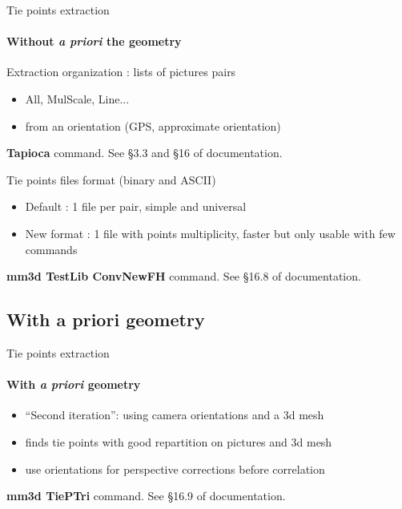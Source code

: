 \documentclass{beamer}
\begin{document}
        \begin{frame}{Tie points extraction }
                \framesubtitle{Without \textit{a priori} the geometry}   
                \begin{block}{Extraction organization : lists of pictures pairs}
                \begin{itemize}
                        \item All, MulScale, Line...
                        \item from an orientation (GPS, approximate orientation)
                \end{itemize}
                \end{block}
                \textbf{Tapioca} command. See §3.3 and §16 of documentation.
\pause
                \begin{block}{Tie points files format (binary and ASCII)}
                \begin{itemize}
                        \item Default : 1 file per pair, simple and universal
                        \item New format : 1 file with points multiplicity, faster but only usable with few commands
                \end{itemize}
                \end{block}
                \textbf{mm3d TestLib ConvNewFH} command. See §16.8 of documentation.
        \end{frame}

\subsection{With a priori geometry}   
        \begin{frame}{Tie points extraction}
                \framesubtitle{With \textit{a priori} geometry}
                \begin{itemize}
                        \item ``Second iteration'': using camera orientations and a 3d mesh
                        \item finds tie points with good repartition on pictures and 3d mesh
                        \item use orientations for perspective corrections before correlation
                \end{itemize}
                \textbf{mm3d TiePTri} command. See §16.9 of documentation.
                
        \end{frame}
\end{document}
